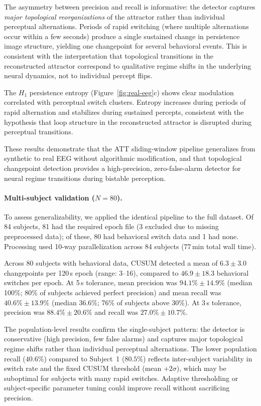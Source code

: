 \documentclass[11pt,a4paper]{article}
\begin{document}
The asymmetry between precision and recall is informative: the detector captures \emph{major topological reorganizations} of the attractor rather than individual perceptual alternations.
Periods of rapid switching (where multiple alternations occur within a few seconds) produce a single sustained change in persistence image structure, yielding one changepoint for several behavioral events.
This is consistent with the interpretation that topological transitions in the reconstructed attractor correspond to qualitative regime shifts in the underlying neural dynamics, not to individual percept flips.

The $H_1$ persistence entropy (Figure~\ref{fig:real-eeg}c) shows clear modulation correlated with perceptual switch clusters.
Entropy increases during periods of rapid alternation and stabilizes during sustained percepts, consistent with the hypothesis that loop structure in the reconstructed attractor is disrupted during perceptual transitions.

These results demonstrate that the ATT sliding-window pipeline generalizes from synthetic to real EEG without algorithmic modification, and that topological changepoint detection provides a high-precision, zero-false-alarm detector for neural regime transitions during bistable perception.

\paragraph{Multi-subject validation ($N = 80$).}
To assess generalizability, we applied the identical pipeline to the full \citet{nie2023accumulating} dataset.
Of 84 subjects, 81 had the required epoch file (3 excluded due to missing preprocessed data); of these, 80 had behavioral switch data and 1 had none.
Processing used 10-way parallelization across 84 subjects (77\,min total wall time).

Across 80 subjects with behavioral data, CUSUM detected a mean of $6.3 \pm 3.0$ changepoints per 120\,s epoch (range: 3--16), compared to $46.9 \pm 18.3$ behavioral switches per epoch.
At 5\,s tolerance, mean precision was $\mathbf{94.1\% \pm 14.9\%}$ (median 100\%; 80\% of subjects achieved perfect precision) and mean recall was $\mathbf{40.6\% \pm 13.9\%}$ (median 36.6\%; 76\% of subjects above 30\%).
At 3\,s tolerance, precision was $88.4\% \pm 20.6\%$ and recall was $27.0\% \pm 10.7\%$.

The population-level results confirm the single-subject pattern: the detector is conservative (high precision, few false alarms) and captures major topological regime shifts rather than individual perceptual alternations.
The lower population recall ($40.6\%$) compared to Subject~1 ($80.5\%$) reflects inter-subject variability in switch rate and the fixed CUSUM threshold (mean $+ 2\sigma$), which may be suboptimal for subjects with many rapid switches.
Adaptive thresholding or subject-specific parameter tuning could improve recall without sacrificing precision.
\end{document}
